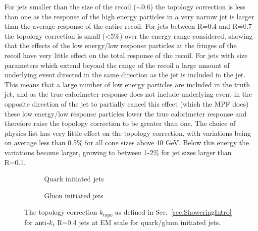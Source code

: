 For jets smaller than the size of the recoil ($\sim$0.6) the topology correction is less than one as the response of the high energy particles in a very narrow jet is larger than the average response of the entire recoil.  
For jets between R=0.4 and R=0.7 the topology correction is small (<5\%) over the energy range considered, showing that the effects of the low energy/low response particles at the fringes of the recoil have very little effect on the total response of the recoil.  
For jets with size parameters which extend beyond the range of the recoil a large amount of underlying event directed in the same direction as the jet is included in the jet.  
This means that a large number of low energy particles are included in the truth jet, and as the true calorimeter response does not include underlying event in the opposite direction of the jet to partially cancel this effect (which the MPF does) these low energy/low response particles lower the true calorimeter response and therefore raise the topology correction to be greater than one.  
The choice of physics list has very little effect on the topology correction, with variations being on average less than 0.5\% for all cone sizes above 40 GeV.  
Below this energy the variations become larger, growing to between 1-2\% for jet sizes larger than R=0.1.  


\begin{figure}[!ht]
  \centering
  \begin{subfigure}{.5\textwidth}
    \centering
    \caption{Quark initiated jets}
  \end{subfigure}%
  \begin{subfigure}{.5\textwidth}  \centering
    \caption{Gluon initiated jets}
  \end{subfigure}
  \caption[Topology correction for quark/gluon initiated jets.]
{\small The topology correction $k_{\mathrm{topo}}$ as defined in Sec.~\ref{sec:ShoweringIntro} for anti-$k_\mathrm{t}$ R=0.4 jets at EM scale for quark/gluon initiated jets.  }
  \label{Fig:TopoCorr_QG4}
\end{figure}

